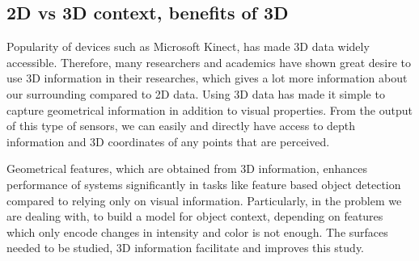 % 
% 
% 

\subsection{2D vs 3D context, benefits of 3D}
Popularity of devices such as Microsoft Kinect, has made 3D data widely accessible. 
Therefore, many researchers and academics have shown great desire to use 3D information in their researches, 
which gives a lot more information about our surrounding compared to 2D data. 
Using 3D data has made it simple to capture geometrical information in addition to visual properties. 
From the output of this type of sensors, we can easily and directly have access to depth information and 3D 
coordinates of any points that are perceived.

Geometrical features, which are obtained from 3D information, enhances performance of systems significantly in tasks like feature 
based object detection compared to relying only on visual information. 
Particularly, in the problem we are dealing with, to build a model for object context, depending on features which only encode 
changes in intensity and color is not enough. The surfaces needed to be studied, 3D information facilitate and improves this study.  